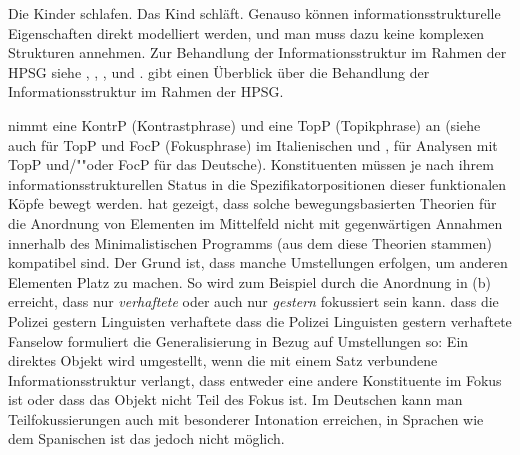 \begin{exe}
\begin{xlist}
\eal
\ex Die Kinder schlafen.
\ex Das Kind schläft.
\zl
Genauso können informationsstrukturelle Eigenschaften direkt modelliert
werden, und man muss dazu keine komplexen Strukturen annehmen. Zur Behandlung der
Informationsstruktur im Rahmen der HPSG siehe , ,
,  
und . \citet{DeKuthyInformationStructureHandbook} gibt einen Überblick über die Behandlung der
Informationsstruktur im Rahmen der HPSG.%


\label{sec-TopP-FocP-KontrP}

\mbox{}\citet[27]{Frey2004a} nimmt eine KontrP (Kontrastphrase) und 
\citet[Abschnitt~5]{Frey2004b-u}
eine TopP (Topikphrase) an (siehe auch  für TopP und FocP (Fokusphrase) im Italienischen und 
,  für Analysen mit TopP und/""oder FocP für das Deutsche).
Konstituenten müssen je nach ihrem informationsstrukturellen Status in die Spezifikatorpositionen
dieser funktionalen Köpfe bewegt werden. \citet{Fanselow2003b} hat gezeigt, dass solche bewegungsbasierten
Theorien für die Anordnung von Elementen im Mittelfeld nicht mit gegenwärtigen Annahmen innerhalb
des Minimalistischen Programms (aus dem diese Theorien stammen) kompatibel sind. Der Grund ist,
dass manche Umstellungen erfolgen, um anderen Elementen Platz zu machen. So wird zum Beispiel
durch die Anordnung in (b) erreicht, dass nur \emph{verhaftete} oder auch nur \emph{gestern}
fokussiert sein kann.
\eal
\ex dass die Polizei gestern Linguisten verhaftete
\ex dass die Polizei Linguisten gestern verhaftete
\zl
Fanselow formuliert die Generalisierung in Bezug auf Umstellungen so: Ein direktes Objekt wird
umgestellt, wenn die mit einem Satz verbundene Informationsstruktur verlangt, dass entweder
eine andere Konstituente im Fokus ist oder dass das Objekt nicht Teil des Fokus ist. Im Deutschen
kann man Teilfokussierungen auch mit besonderer Intonation erreichen, in Sprachen wie dem Spanischen
ist das jedoch nicht möglich.


\end{xlist}
\end{exe}
